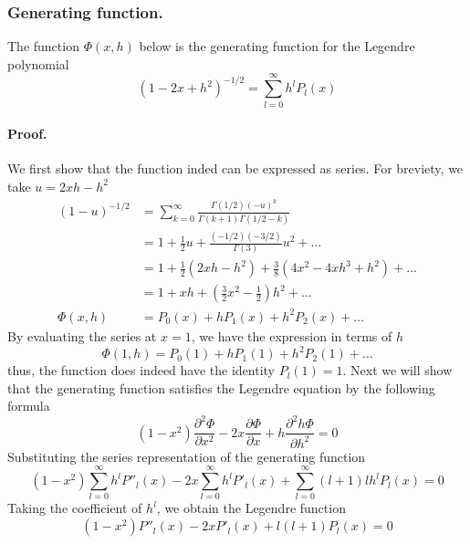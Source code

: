 \documentclass[../main.tex]{subfiles}
\begin{document}
\subsubsection*{Generating function.} The function $\Phi(x,h)$ below is the generating function for the Legendre polynomial
\begin{equation*}
    (1-2x+h^2)^{-1/2}=\sum_{l=0}^{\infty}h^lP_l(x)
\end{equation*}

\paragraph*{Proof.} We first show that  the function inded can be expressed as series. For breviety, we take $u=2xh-h^2$
\begin{align*}
    (1-u)^{-1/2} &=\sum_{k=0}^{\infty}\frac{\Gamma(1/2)(-u)^k}{\Gamma(k+1)\Gamma(1/2-k)}\\
    &=1+\frac{1}{2}u+\frac{(-1/2)(-3/2)}{\Gamma(3)}u^{2}+\dots\\
    &=1+\frac{1}{2}(2xh-h^2)+\frac{3}{8}(4x^2-4xh^3+h^2)+\dots\\
    &=1+ xh +\left(\frac{3}{2}x^2-\frac{1}{2}\right)h^2+\dots\\
    \Phi(x,h)&=P_0(x) +hP_1(x) +h^2P_2(x) +\dots
\end{align*}
By evaluating the series at $x=1$, we have the expression in terms of $h$
\begin{equation*}
    \Phi(1,h)=P_0(1) +hP_1(1) +h^2P_2(1) +\dots
\end{equation*}
thus, the function does indeed have the identity $P_l(1)=1$. Next we will show that the generating function satisfies the Legendre equation by the following formula
\begin{equation*}
    (1-x^2)\frac{\partial^2\Phi}{\partial x^2}-2x\frac{\partial\Phi}{\partial x}+h\frac{\partial^2h\Phi}{\partial h^2}=0
\end{equation*} 
Substituting the series representation of the generating function 
\begin{equation*}
    (1-x^2)\sum_{l=0}^{\infty}h^lP''_l(x) -2x\sum_{l=0}^{\infty}h^lP'_l(x) +\sum_{l=0}^{\infty}(l+1)lh^lP_l(x)=0
\end{equation*} 
Taking the coefficient of $h^l$, we obtain the Legendre function
\begin{equation*}
    (1-x^2)P''_l(x) -2xP'_l(x) +l(l+1)P_l(x)=0
\end{equation*} 
\end{document}
